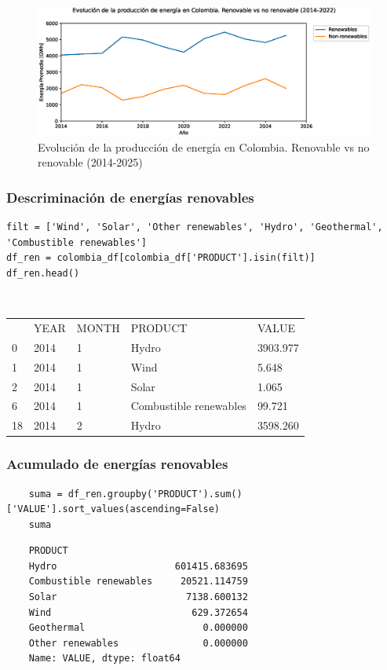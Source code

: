\documentclass{article}
\begin{document}
\begin{figure}[t]
	\centering
	\includegraphics[width=0.7\linewidth]{fig_11}
	\caption{Evolución de la producción de energía en Colombia. Renovable vs no renovable (2014-2025)}
	\label{fig:fig11}
\end{figure}




\subsubsection{Descriminaci\'on de energ\'ias renovables}

\begin{verbatim}
filt = ['Wind', 'Solar', 'Other renewables', 'Hydro', 'Geothermal', 'Combustible renewables']
df_ren = colombia_df[colombia_df['PRODUCT'].isin(filt)]
df_ren.head()
\end{verbatim}

{\tt
	\begin{tabular}{lllll}
		& YEAR & MONTH & PRODUCT                & VALUE    \\
		0  & 2014 & 1     & Hydro                  & 3903.977 \\
		1  & 2014 & 1     & Wind                   & 5.648    \\
		2  & 2014 & 1     & Solar                  & 1.065    \\
		6  & 2014 & 1     & Combustible renewables & 99.721   \\
		18 & 2014 & 2     & Hydro                  & 3598.260
	\end{tabular}
}

\subsubsection{Acumulado de energ\'ias renovables}

\begin{verbatim}
	suma = df_ren.groupby('PRODUCT').sum()['VALUE'].sort_values(ascending=False)
	suma	
\end{verbatim}

\begin{verbatim}
	PRODUCT
	Hydro                     601415.683695
	Combustible renewables     20521.114759
	Solar                       7138.600132
	Wind                         629.372654
	Geothermal                     0.000000
	Other renewables               0.000000
	Name: VALUE, dtype: float64
\end{verbatim}
\end{document}
